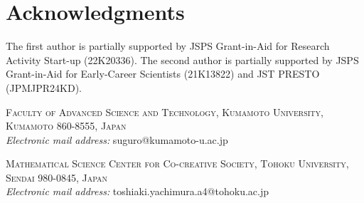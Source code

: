 \documentclass[a4paper,11pt]{article}
\theoremstyle{plain}
\theoremstyle{definition}
\theoremstyle{remark}
\theoremstyle{plain}
\numberwithin{equation}{section}
\newcommand{\1}{\mbox{1}\hspace{-0.25em}\mbox{l}} %
\begin{document}
\section*{Acknowledgments}
The first author is partially supported by JSPS Grant-in-Aid for Research Activity Start-up (22K20336). The second author is partially supported by JSPS Grant-in-Aid for Early-Career Scientists (21K13822) and JST PRESTO (JPMJPR24KD).





\bigskip

\noindent
\textsc{
Faculty of Advanced Science and Technology, Kumamoto University, Kumamoto 860-8555, Japan}\\
\noindent
\emph{Electronic mail address:}
suguro@kumamoto-u.ac.jp

\bigskip

\noindent
\textsc{ 
Mathematical Science Center for Co-creative Society, Tohoku University, 
Sendai 980-0845, Japan} \\
\noindent
\emph{Electronic mail address:}
toshiaki.yachimura.a4@tohoku.ac.jp
\end{document}
